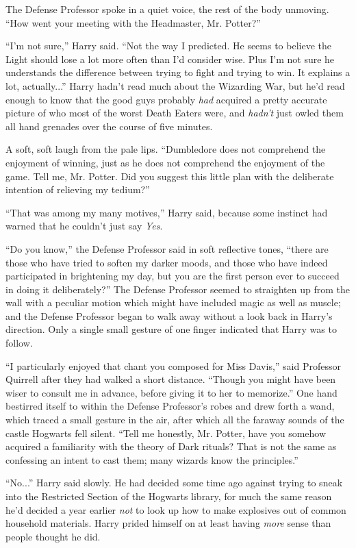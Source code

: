 The Defense Professor spoke in a quiet voice, the rest of the body
unmoving. ``How went your meeting with the Headmaster, Mr. Potter?''

``I'm not sure,'' Harry said. ``Not the way I predicted. He seems to
believe the Light should lose a lot more often than I'd consider wise.
Plus I'm not sure he understands the difference between trying to fight
and trying to win. It explains a lot, actually...'' Harry hadn't
read much about the Wizarding War, but he'd read enough to know that the
good guys probably \emph{had} acquired a pretty accurate picture of who
most of the worst Death Eaters were, and \emph{hadn't} just owled them
all hand grenades over the course of five minutes.

A soft, soft laugh from the pale lips. ``Dumbledore does not comprehend
the enjoyment of winning, just as he does not comprehend the enjoyment
of the game. Tell me, Mr. Potter. Did you suggest this little plan with
the deliberate intention of relieving my tedium?''

``That was among my many motives,'' Harry said, because some instinct
had warned that he couldn't just say \emph{Yes}.

``Do you know,'' the Defense Professor said in soft reflective tones,
``there are those who have tried to soften my darker moods, and those
who have indeed participated in brightening my day, but you are the
first person ever to succeed in doing it deliberately?'' The Defense
Professor seemed to straighten up from the wall with a peculiar motion
which might have included magic as well as muscle; and the Defense
Professor began to walk away without a look back in Harry's direction.
Only a single small gesture of one finger indicated that Harry was to
follow.

``I particularly enjoyed that chant you composed for Miss Davis,'' said
Professor Quirrell after they had walked a short distance. ``Though you
might have been wiser to consult me in advance, before giving it to her
to memorize.'' One hand bestirred itself to within the Defense
Professor's robes and drew forth a wand, which traced a small gesture in
the air, after which all the faraway sounds of the castle Hogwarts fell
silent. ``Tell me honestly, Mr. Potter, have you somehow acquired a
familiarity with the theory of Dark rituals? That is not the same as
confessing an intent to cast them; many wizards know the principles.''

``No...'' Harry said slowly. He had decided some time ago against
trying to sneak into the Restricted Section of the Hogwarts library, for
much the same reason he'd decided a year earlier \emph{not} to look up
how to make explosives out of common household materials. Harry prided
himself on at least having \emph{more} sense than people thought he did.

